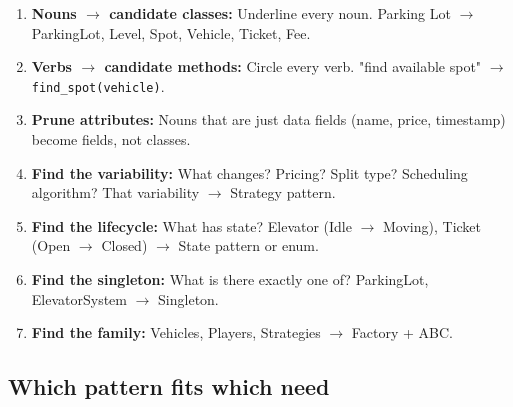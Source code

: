 \documentclass[11pt]{article}
\providecommand{\tightlist}{\setlength{\itemsep}{1pt}\setlength{\parskip}{0pt}}
\begin{document}
\begin{enumerate}
\def\labelenumi{\arabic{enumi}.}
\tightlist
\item
  \textbf{Nouns \(\rightarrow\) candidate classes:} Underline every noun. Parking Lot \(\rightarrow\) ParkingLot, Level, Spot, Vehicle, Ticket, Fee.
\item
  \textbf{Verbs \(\rightarrow\) candidate methods:} Circle every verb. "find available spot" \(\rightarrow\) \texttt{find\_spot(vehicle)}.
\item
  \textbf{Prune attributes:} Nouns that are just data fields (name, price, timestamp) become fields, not classes.
\item
  \textbf{Find the variability:} What changes? Pricing? Split type? Scheduling algorithm? That variability \(\rightarrow\) Strategy pattern.
\item
  \textbf{Find the lifecycle:} What has state? Elevator (Idle \(\rightarrow\) Moving), Ticket (Open \(\rightarrow\) Closed) \(\rightarrow\) State pattern or enum.
\item
  \textbf{Find the singleton:} What is there exactly one of? ParkingLot, ElevatorSystem \(\rightarrow\) Singleton.
\item
  \textbf{Find the family:} Vehicles, Players, Strategies \(\rightarrow\) Factory + ABC.
\end{enumerate}

\subsection{Which pattern fits which need}\label{which-pattern-fits-which-need}
\end{document}
